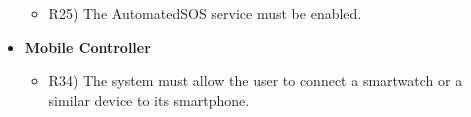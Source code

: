 \begin{itemize}
\begin{itemize}
			\item R25) The AutomatedSOS service must be enabled.\\
		\end{itemize}
		\item \textbf{Mobile Controller}
		\begin{itemize}
			\item R34) The system must allow the user to connect a smartwatch or a similar device to its smartphone.\\
		\end{itemize}
	\end{itemize}
	
